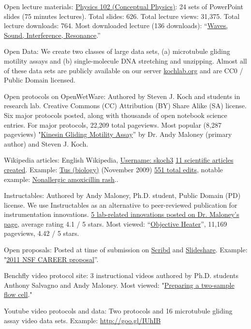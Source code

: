 \documentclass[11pt]{article}
\begin{document}
\ind Open lecture materials: \href{http://goo.gl/2L7kC}{Physics 102 (Conceptual Physics)}: 24 sets of PowerPoint slides (75 minutes lectures).  Total slides: 626. Total lecture views: 31,375. Total lecture downloads: 764. Most downloaded lecture (136 downloads): “\href{http://goo.gl/FCsfM}{Waves, Sound, Interference, Resonance}.” 

\ind Open Data: We create two classes of large data sets, (a) microtubule gliding motility assays and (b) single-molecule DNA stretching and unzipping.  Almost all of these data sets are publicly available on our server \href{http://goo.gl/5MlVY}{kochlab.org} and are CC0 / Public Domain licensed. 

\ind Open protocols on OpenWetWare: Authored by Steven J. Koch and students in research lab. Creative Commons (CC) Attribution (BY) Share Alike (SA) license. Six major protocols posted, along with thousands of open notebook science entries.  For major protocols, 22,209 total pageviews.  Most popular (8,287 pageviews) "\href{http://goo.gl/nGmJb}{Kinesin Gliding Motility Assay}” by Dr. Andy Maloney (primary author) and Steven J. Koch.  

\ind Wikipedia articles: English Wikipedia, \href{http://goo.gl/Uz9MS}{Username: skoch3} \href{http://goo.gl/MZROA}{11 scientific articles created}. Example: \href{http://goo.gl/Tgr5u}{Tus (biology)} (November 2009) \href{http://goo.gl/oroi1}{551 total edits}, notable example: \href{http://goo.gl/qYkHt}{Nonallergic amoxicillin rash}.. 

\ind Instructables: Authored by Andy Maloney, Ph.D. student, Public Domain (PD) license. We use Instructables as an alternative to peer-reviewed publication for instrumentation innovations.  \href{http://goo.gl/sVvZs}{5 lab-related innovations posted on Dr. Maloney’s page}, average rating 4.1 / 5 stars.  Most viewed: “\href{http://goo.gl/oOgjZ}{Objective Heater}”, 11,169 pageviews, 4.42 / 5 stars.

\ind Open proposals: Posted at time of submission on \href{http://goo.gl/Xhv1C}{Scribd} and \href{http://goo.gl/zeLJW}{Slideshare}. Example: "\href{http://goo.gl/nQ20k}{2011 NSF CAREER proposal}”. 

\ind Benchfly video protocol site: 3 instructional videos authored by Ph.D. students Anthony Salvagno and Andy Maloney.  Most viewed: "\href{http://goo.gl/tHkob}{Preparing a two-sample flow cell}."

\ind Youtube video protocols and data: Two protocols and 16 microtubule gliding assay video data sets.  Example: \href{http://goo.gl/IUhIB}{http://goo.gl/IUhIB}  
\end{document}
